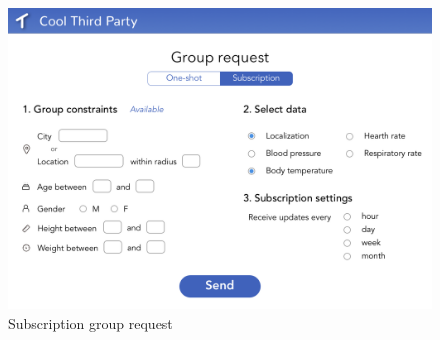 
\begin{figure}[H]
    \centering
    \includegraphics[scale=0.2]{Pictures/Mockup/web/group2.png}
    \caption{Subscription group request}
\end{figure}

